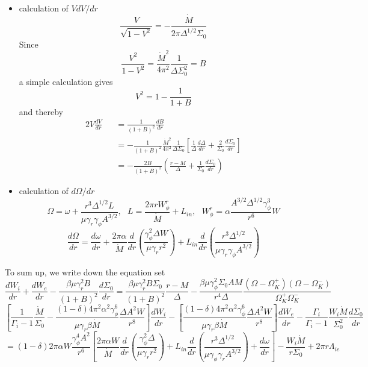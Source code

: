 \documentclass[12pt]{book}
\begin{document}
\begin{itemize}
 \item calculation of $VdV/dr$
\begin{equation}
\frac{V}{\sqrt{1-V^2}}=-\frac{\dot M}{2\pi\Delta^{1/2}\Sigma_0} 
\end{equation}
Since
\begin{equation}
 \frac{V^2}{1-V^2}=\frac{\dot M^2}{4\pi^2}\frac{1}{\Delta\Sigma_{0}^2}=B
\end{equation}
a simple calculation gives
\begin{equation}
 V^2=1-\frac{1}{1+B}
\end{equation}
and thereby
\begin{eqnarray}
2V\frac{dV}{dr}&&=\frac{1}{(1+B)^2}\frac{dB}{dr}\\
&&=-\frac{1}{(1+B)^2}\frac{\dot M^2}{4\pi^2}\frac{1}{\Delta\Sigma_{0}}
\left[\frac{1}{\Delta}\frac{d\Delta}{dr}+\frac{2}{\Sigma_0}\frac{d\Sigma_0}{dr}\right]\\
&&=-\frac{2B}{(1+B)^2}\left(\frac{r-M}{\Delta}+\frac{1}{\Sigma_0}\frac{d\Sigma_0}{dr}\right)
\end{eqnarray}
\item calculation of $d\Omega/dr$
\begin{equation}
 \Omega=\omega+\frac{r^3 \Delta^{1/2} L}{\mu \gamma_r\gamma_\phi A^{3/2}},
~~~L=\frac{2\pi rW_\phi^r}{\dot M}+L_{in},
~~~W_\phi^r=\alpha\frac{A^{3/2}\Delta^{1/2}\gamma_\phi^3}{r^6}W
\end{equation}
\begin{equation}
\frac{d\Omega}{dr}=\frac{d\omega}{dr}+\frac{2\pi\alpha}{\dot M}\frac{d}{dr}
\left(\frac{\gamma_\phi^2\Delta W}{\mu\gamma_rr^2}\right)
+L_{in}\frac{d}{dr}\left(\frac{r^3\Delta^{1/2}}{\mu\gamma_r\gamma_\phi A^{3/2}}\right)
\end{equation}
\end{itemize}
To sum up, we write down the equation set
\begin{equation}
\frac{dW_i}{dr} + \frac{dW_e}{dr} -\frac{\beta\mu\gamma_r^2B}{(1+B)^2}\frac{d\Sigma_0}{dr}=
\frac{\beta\mu\gamma_r^2B\Sigma_0}{(1+B)^2}\frac{r-M}{\Delta}
-\frac{\beta\mu\gamma_\phi^2\Sigma_0AM}{r^4\Delta}\frac{(\Omega-\Omega_K^+)(\Omega-\Omega_K^-)}{\Omega_K^+\Omega_K^-}
\end{equation}
\begin{equation}\nonumber
\left[\frac{1}{\Gamma_i-1}\frac{\dot M}{\Sigma_0}
-\frac{(1-\delta)4\pi^2\alpha^2\gamma_\phi^6}{\mu\gamma_r\beta\dot M}\frac{\Delta A^2W}{r^8}\right]\frac{dW_i}{dr}
-\left[\frac{(1-\delta)4\pi^2\alpha^2\gamma_\phi^6}{\mu\gamma_r\beta\dot M}\frac{\Delta A^2W}{r^8}\right]\frac{dW_e}{dr}
-\frac{\Gamma_i}{\Gamma_i-1}\frac{W_i\dot M}{\Sigma_0^2}\frac{d\Sigma_0}{dr}
\end{equation}
\begin{equation}
=(1-\delta)2\pi\alpha W\frac{\gamma_\phi^4A^2}{r^6}
\left[\frac{2\pi\alpha W}{\dot M}\frac{d}{dr}\left(\frac{\gamma_\phi^2\Delta}{\mu\gamma_rr^2}\right)
+L_{in}\frac{d}{dr}\left(\frac{r^3\Delta^{1/2}}{\mu\gamma_\phi\gamma_r A^{3/2}}\right)
+\frac{d\omega}{dr}
\right]
-\frac{W_i\dot M}{r\Sigma_0}+2\pi r \Lambda_{ie}
\end{equation}
\end{document}
